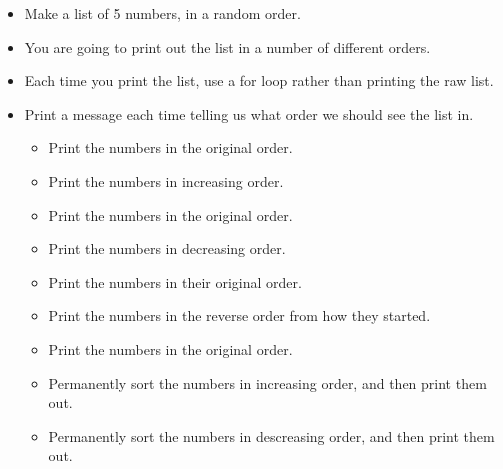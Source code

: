 \documentclass[11pt]{article}
\providecommand{\tightlist}{%
      \setlength{\itemsep}{0pt}\setlength{\parskip}{0pt}}
\begin{document}
\begin{itemize}
\tightlist
\item
  Make a list of 5 numbers, in a random order.
\item
  You are going to print out the list in a number of different orders.
\item
  Each time you print the list, use a for loop rather than printing the
  raw list.
\item
  Print a message each time telling us what order we should see the list
  in.

  \begin{itemize}
  \tightlist
  \item
    Print the numbers in the original order.
  \item
    Print the numbers in increasing order.
  \item
    Print the numbers in the original order.
  \item
    Print the numbers in decreasing order.
  \item
    Print the numbers in their original order.
  \item
    Print the numbers in the reverse order from how they started.
  \item
    Print the numbers in the original order.
  \item
    Permanently sort the numbers in increasing order, and then print
    them out.
  \item
    Permanently sort the numbers in descreasing order, and then print
    them out.
  \end{itemize}
\end{itemize}
\end{document}
